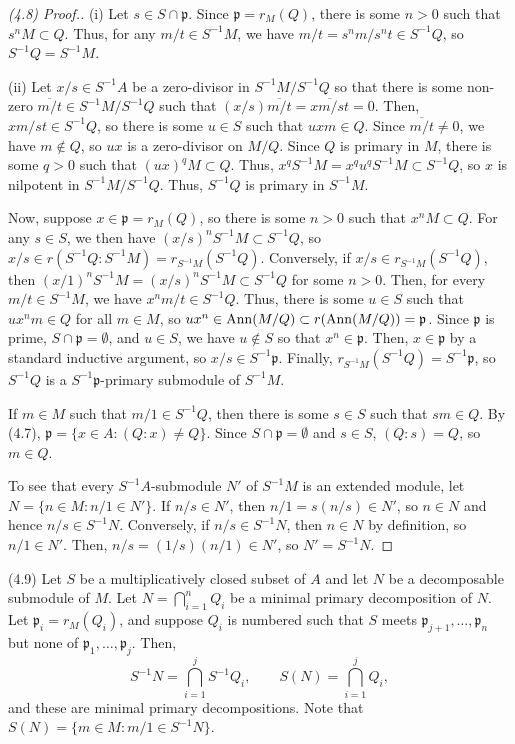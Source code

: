 \begin{proof}[(4.8) Proof.]
(i) Let $s \in S \cap \mathfrak{p}$. Since $\mathfrak{p} = r_M(Q)$, there is some $n > 0$ such that $s^n M \subset Q$. Thus, for any $m/t \in S^{-1}M$, we have $m/t = s^nm/s^nt \in S^{-1}Q$,
so $S^{-1}Q = S^{-1}M$.

(ii) Let $x/s \in S^{-1}A$ be a zero-divisor in $S^{-1}M/S^{-1}Q$ so that there is some non-zero $\overline{m/t} \in S^{-1}M/S^{-1}Q$ such that $(x/s)\overline{m/t} = \overline{xm/st} = 0$. Then,
$xm/st \in S^{-1}Q$, so there is some $u \in S$ such that $uxm \in Q$. Since $\overline{m/t} \neq 0$, we have $m \not\in Q$, so $ux$ is a zero-divisor on $M/Q$. Since $Q$ is primary in $M$, there is
some $q > 0$ such that $(ux)^qM \subset Q$. Thus, $x^q S^{-1}M = x^q u^q S^{-1}M \subset S^{-1}Q$, so $x$ is nilpotent in $S^{-1}M/S^{-1}Q$. Thus, $S^{-1}Q$ is primary in $S^{-1}M$.

Now, suppose $x \in \mathfrak{p} = r_M(Q)$, so there is some $n > 0$ such that $x^n M \subset Q$. For any $s \in S$, we then have $(x/s)^n S^{-1}M \subset S^{-1}Q$, so
$x/s \in r(S^{-1}Q:S^{-1}M) = r_{S^{-1}M}(S^{-1}Q)$. Conversely, if $x/s \in r_{S^{-1}M}(S^{-1}Q)$, then $(x/1)^nS^{-1}M = (x/s)^n S^{-1}M \subset S^{-1}Q$ for some $n > 0$. 
Then, for every $m/t \in S^{-1}M$, we have $x^n m/t \in S^{-1}Q$. Thus, there is some $u \in S$ such that $u x^n m \in Q$ for all $m \in M$, so $u x^n \in \operatorname{Ann}(M/Q) \subset r(\operatorname{Ann}(M/Q)) = \mathfrak{p}$.
Since $\mathfrak{p}$ is prime, $S \cap \mathfrak{p} = \emptyset$, and $u \in S$, we have $u \not\in S$ so that $x^n \in \mathfrak{p}$. Then, $x \in \mathfrak{p}$ by a standard inductive argument, so
$x/s \in S^{-1}\mathfrak{p}$. Finally, $r_{S^{-1}M}(S^{-1}Q) = S^{-1}\mathfrak{p}$, so $S^{-1}Q$ is a $S^{-1}\mathfrak{p}$-primary submodule of $S^{-1}M$.

If $m \in M$ such that $m/1 \in S^{-1}Q$, then there is some $s \in S$ such that $sm \in Q$. By (4.7), $\mathfrak{p} = \{x \in A: (Q:x) \neq Q\}$. Since $S \cap \mathfrak{p} = \emptyset$ and $s \in S$,
$(Q:s) = Q$, so $m \in Q$.

To see that every $S^{-1}A$-submodule $N'$ of $S^{-1}M$ is an extended module, let $N = \{n \in M : n/1 \in N'\}$. If $n/s \in N'$, then $n/1 = s(n/s) \in N'$, so $n \in N$ and hence $n/s \in S^{-1}N$.
Conversely, if $n/s \in S^{-1}N$, then $n \in N$ by definition, so $n/1 \in N'$. Then, $n/s = (1/s)(n/1) \in N'$, so $N' = S^{-1}N$.
\end{proof}

(4.9) Let $S$ be a multiplicatively closed subset of $A$ and let $N$ be a decomposable submodule of $M$. Let $N = \bigcap_{i=1}^n Q_i$ be a minimal primary decomposition of $N$. Let $\mathfrak{p}_i = r_M(Q_i)$,
and suppose $Q_i$ is numbered such that $S$ meets $\mathfrak{p}_{j+1},\ldots,\mathfrak{p}_n$ but none of $\mathfrak{p}_1,\ldots,\mathfrak{p}_j$. Then,
$$S^{-1}N = \bigcap_{i=1}^j S^{-1}Q_i, \qquad S(N) = \bigcap_{i=1}^j Q_i,$$
and these are minimal primary decompositions. Note that $S(N) = \{m \in M : m/1 \in S^{-1}N\}$.

